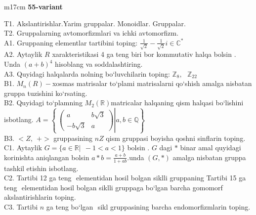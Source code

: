 \documentclass{article}
\begin{document}
\begin{tabular}{m{17cm}}
\textbf{55-variant}
\newline

T1. Akslantirishlar.Yarim gruppalar. Monoidlar. Gruppalar. \\
T2. Gruppalarning avtomorfizmlari va ichki avtomorfizm. \\
A1. Gruppaning elementlar tartibini toping: \(\frac{1}{\sqrt{2}} - \frac{1}{\sqrt{2}}i \in \mathbb{C}^{*}\) \\
A2. Aytaylik \(R\) xarakteristikasi 4 ga teng biri bor kommutativ halqa bo\textquotesingle lsin . Unda \((a + b)^{4}\) hisoblang va soddalashtiring. \\
A3. Quyidagi halqalarda nolning bo`luvchilarin toping: \(\mathbb{Z}_{8},\ \ \ \mathbb{Z}_{22}\) \\
B1. \(M_{n}(R) -\)xosmas matrisalar to`plami matrisalarni qo`shish amalga nisbatan gruppa tuzishini ko`rsating. \\
B2. Quyidagi to`plamning \(M_{2}(\mathbb{R})\)matricalar halqaning qism halqasi bo`lishini isbotlang. \(A = \left\{ \left. \ \begin{pmatrix}
a & b\sqrt{3} \\
 - b\sqrt{3} & a
\end{pmatrix} \right|a,b\mathbb{\in Q} \right\}\) \\
B3. \(< Z,\ \  + >\) gruppasining \(nZ\) qism gruppasi boyisha qo\textquotesingle shni sinflarin toping. \\
C1. Aytaylik \(G = \{ a\mathbb{\in R}|\ \  - 1 < a < 1\}\) bo\textquotesingle lsin . \(G\) dagi \(*\) binar amal quyidagi ko\textquotesingle rinishta aniqlangan bo\textquotesingle lsin \(a*b = \frac{a + b}{1 + ab}.\)unda \((G,*)\) amalga nisbatan gruppa tashkil etishin isbotlang. \\
C2. Tartibi 12 ga teng \(< a >\) elementidan hosil bo\textquotesingle lgan siklli gruppaning Tartibi 15 ga teng \(< b >\) elementidan hosil bo\textquotesingle lgan siklli gruppaga bo`lgan barcha gomomorf akslantirishlarin toping. \\
C3. Tartibi \(n\) ga teng bo`lgan \(< a >\) sikl gruppasining barcha endomorfizmlarin toping. \\

\end{tabular}
\vspace{1cm}
\end{document}
